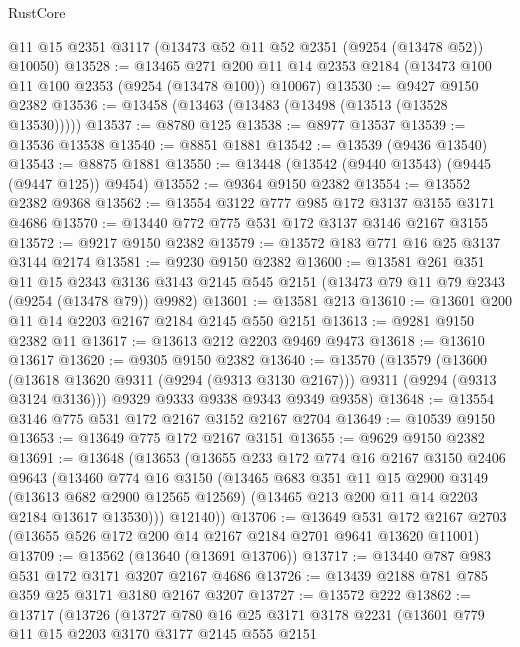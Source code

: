 \begin{lexlean}{RustCore}
\begin{coremodule}
    @11
    @15
    @2351
    @3117
    (@13473 @52 @11 @52 @2351 (@9254 (@13478 @52)) @10050)
@13528 := @13465
    @271
    @200
    @11
    @14
    @2353
    @2184
    (@13473 @100 @11 @100 @2353 (@9254 (@13478 @100)) @10067)
@13530 := @9427 @9150 @2382
@13536 := @13458 (@13463 (@13483 (@13498 (@13513 (@13528 @13530)))))
@13537 := @8780 @125
@13538 := @8977 @13537
@13539 := @13536 @13538
@13540 := @8851 @1881
@13542 := @13539 (@9436 @13540)
@13543 := @8875 @1881
@13550 := @13448 (@13542 (@9440 @13543) (@9445 (@9447 @125)) @9454)
@13552 := @9364 @9150 @2382
@13554 := @13552 @2382 @9368
@13562 := @13554 @3122 @777 @985 @172 @3137 @3155 @3171 @4686
@13570 := @13440 @772 @775 @531 @172 @3137 @3146 @2167 @3155
@13572 := @9217 @9150 @2382
@13579 := @13572 @183 @771 @16 @25 @3137 @3144 @2174
@13581 := @9230 @9150 @2382
@13600 := @13581
    @261
    @351
    @11
    @15
    @2343
    @3136
    @3143
    @2145
    @545
    @2151
    (@13473 @79 @11 @79 @2343 (@9254 (@13478 @79)) @9982)
@13601 := @13581 @213
@13610 := @13601 @200 @11 @14 @2203 @2167 @2184 @2145 @550 @2151
@13613 := @9281 @9150 @2382 @11
@13617 := @13613 @212 @2203 @9469 @9473
@13618 := @13610 @13617
@13620 := @9305 @9150 @2382
@13640 := @13570
    (@13579
      (@13600 (@13618 @13620 @9311 (@9294 (@9313 @3130 @2167))) @9311 (@9294 (@9313 @3124 @3136)))
      @9329
      @9333
      @9338
      @9343
      @9349
      @9358)
@13648 := @13554 @3146 @775 @531 @172 @2167 @3152 @2167 @2704
@13649 := @10539 @9150
@13653 := @13649 @775 @172 @2167 @3151
@13655 := @9629 @9150 @2382
@13691 := @13648
    (@13653
      (@13655
        @233
        @172
        @774
        @16
        @2167
        @3150
        @2406
        @9643
        (@13460
          @774
          @16
          @3150
          (@13465
            @683
            @351
            @11
            @15
            @2900
            @3149
            (@13613 @682 @2900 @12565 @12569)
            (@13465 @213 @200 @11 @14 @2203 @2184 @13617 @13530)))
        @12140))
@13706 := @13649
    @531
    @172
    @2167
    @2703
    (@13655 @526 @172 @200 @14 @2167 @2184 @2701 @9641 @13620 @11001)
@13709 := @13562 (@13640 (@13691 @13706))
@13717 := @13440 @787 @983 @531 @172 @3171 @3207 @2167 @4686
@13726 := @13439 @2188 @781 @785 @359 @25 @3171 @3180 @2167 @3207
@13727 := @13572 @222
@13862 := @13717
    (@13726
      (@13727
        @780
        @16
        @25
        @3171
        @3178
        @2231
        (@13601
          @779
          @11
          @15
          @2203
          @3170
          @3177
          @2145
          @555
          @2151

\end{coremodule}
\end{lexlean}
